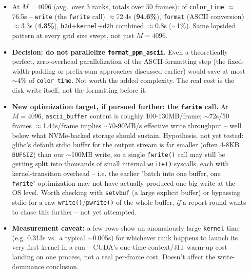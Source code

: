 \begin{itemize}
\item At $M=4096$ (avg.\ over 3 ranks, totals over 50 frames): of \texttt{color\_time} $\approx$76.5s -- \texttt{write} (the \texttt{fwrite} call) $\approx$72.4s (\textbf{94.6\%}), \texttt{format} (ASCII conversion) $\approx$3.3s (\textbf{4.3\%}), \texttt{h2d}+\texttt{kernel}+\texttt{d2h} combined $\approx$0.8s ($\sim$1\%). Same lopsided pattern at every grid size swept, not just $M=4096$.
\item \textbf{Decision: do not parallelize \texttt{format\_ppm\_ascii}.} Even a theoretically perfect, zero-overhead parallelization of the ASCII-formatting step (the fixed-width-padding or prefix-sum approaches discussed earlier) would save at most $\sim$4\% of \texttt{color\_time}. Not worth the added complexity. The real cost is the disk write itself, not the formatting before it.
\item \textbf{New optimization target, if pursued further: the \texttt{fwrite} call.} At $M=4096$, \texttt{ascii\_buffer} content is roughly 100-130MB/frame; $\sim$72s/50 frames $\approx$1.44s/frame implies $\sim$70-90MB/s effective write throughput -- well below what NVMe-backed storage should sustain. Hypothesis, not yet tested: glibc's default stdio buffer for the output stream is far smaller (often 4-8KB \texttt{BUFSIZ}) than our $\sim$100MB write, so a single \texttt{fwrite()} call may still be getting split into thousands of small internal \texttt{write()} syscalls, each with kernel-transition overhead -- i.e. the earlier "batch into one buffer, one \texttt{fwrite}" optimization may not have actually produced one big write at the OS level. Worth checking with \texttt{setvbuf} (a large explicit buffer) or bypassing stdio for a raw \texttt{write()}/\texttt{pwrite()} of the whole buffer, \emph{if} a report round wants to chase this further -- not yet attempted.
\item \textbf{Measurement caveat:} a few rows show an anomalously large \texttt{kernel} time (e.g. 0.313s vs.\ a typical $\sim$0.005s) for whichever rank happens to launch its very first kernel in a run -- CUDA's one-time context/JIT warm-up cost landing on one process, not a real per-frame cost. Doesn't affect the write-dominance conclusion.
\end{itemize}

